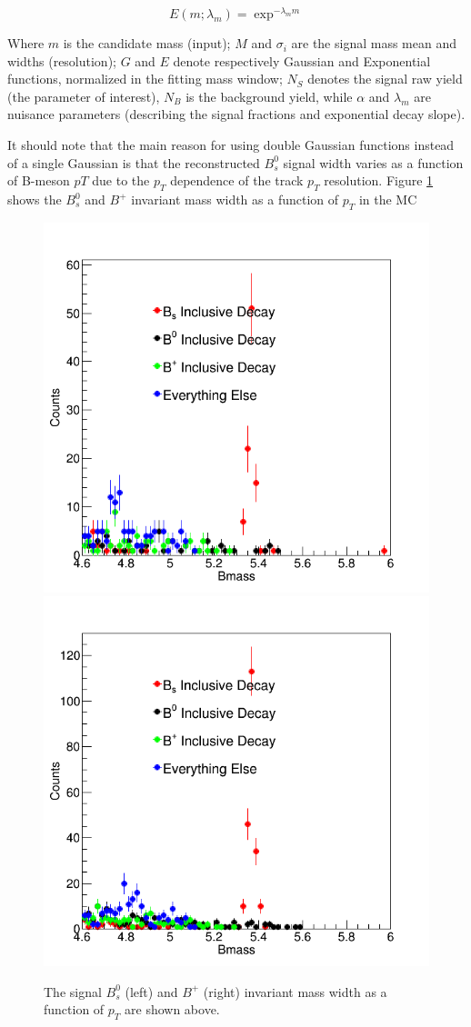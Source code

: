 \begin{equation}
E(m;\lambda_m) = \exp^{-\lambda_m m}
\end{equation}

Where $m$ is the candidate mass (input); $M$ and $\sigma_i$ are the signal mass mean and widths (resolution); $G$ and $E$ denote respectively Gaussian and Exponential functions, normalized in the fitting mass window; $N_S$ denotes the signal raw yield (the parameter of interest),  $N_B$ is the background yield, while $\alpha$ and $\lambda_m$ are nuisance parameters (describing the signal fractions and exponential decay slope). %

It should note that the main reason for using double Gaussian functions instead of a single Gaussian is that the reconstructed $B^0_s$ signal width varies as a function of B-meson $pT$ due to the $p_T$ dependence of the track $p_T$ resolution. Figure \ref{BsBPWidthPT} shows the $B^0_s$ and $B^+$ invariant mass width as a function of $p_T$ in the MC


\begin{figure}[ht!]
\centering
\includegraphics[width=0.45\linewidth]{Figures/Chapter5/BmesonBackground_0.png}
\includegraphics[width=0.45\linewidth]{Figures/Chapter5/BmesonBackground_1.png}
\caption{The signal $B^0_s$ (left) and $B^+$ (right) invariant mass width as a function of $p_T$ are shown above.}
\label{BsBPWidthPT}
\end{figure}


